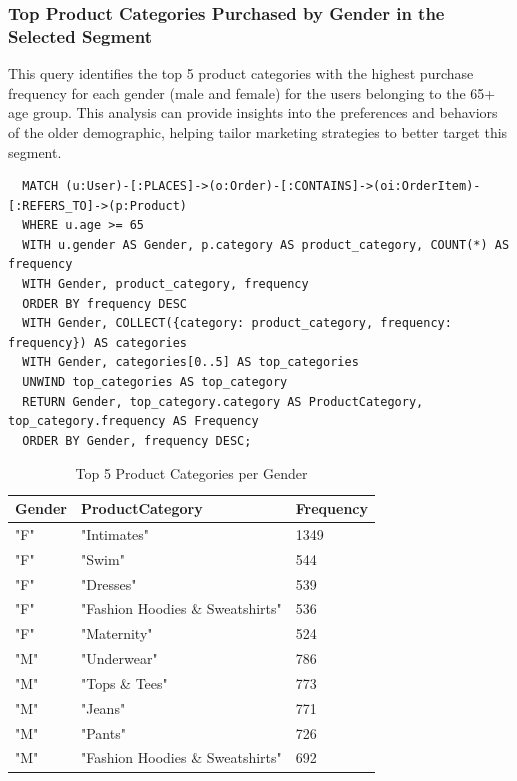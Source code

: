 \documentclass[a4paper,12pt]{article}
\begin{document}
\subsubsection{Top Product Categories Purchased by Gender in the Selected Segment}
This query identifies the top 5 product categories with the highest purchase frequency for each gender (male and female) for the users belonging to the 65+ age group.
This analysis can provide insights into the preferences and behaviors of the older demographic, helping tailor marketing strategies to better target this segment.

\begin{verbatim}
  MATCH (u:User)-[:PLACES]->(o:Order)-[:CONTAINS]->(oi:OrderItem)-[:REFERS_TO]->(p:Product)
  WHERE u.age >= 65
  WITH u.gender AS Gender, p.category AS product_category, COUNT(*) AS frequency
  WITH Gender, product_category, frequency
  ORDER BY frequency DESC
  WITH Gender, COLLECT({category: product_category, frequency: frequency}) AS categories
  WITH Gender, categories[0..5] AS top_categories
  UNWIND top_categories AS top_category
  RETURN Gender, top_category.category AS ProductCategory, top_category.frequency AS Frequency
  ORDER BY Gender, frequency DESC;
\end{verbatim}

\begin{table}[h!]
  \centering
  \caption{Top 5 Product Categories per Gender}
  \label{tab:processing_data}
  \begin{tabular}{l l l}
      \toprule
      \textbf{Gender} & \textbf{ProductCategory} & \textbf{Frequency} \\
      \midrule
      "F"	& "Intimates" &	1349\\
      "F" & "Swim" & 544 \\
      "F" & "Dresses" & 539 \\
      "F" & "Fashion Hoodies \& Sweatshirts" & 536 \\
      "F" & "Maternity" & 524 \\
      "M" & "Underwear" & 786 \\
      "M" & "Tops \& Tees" & 773 \\
      "M" & "Jeans" & 771 \\
      "M" & "Pants" & 726 \\
      "M" & "Fashion Hoodies \& Sweatshirts" & 692 \\
      \bottomrule
  \end{tabular}
\end{table}
\end{document}
